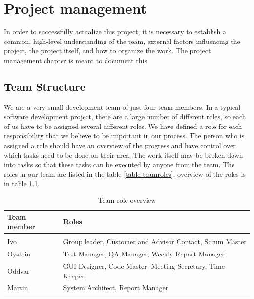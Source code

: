 \chapter{Project management}

\minitoc

In order to successfully actualize this project, it is necessary to establish a common, high-level understanding of the team, external factors influencing the project, the project itself, and how to organize the work. The project management chapter is meant to document this.

\clearpage

\section{Team Structure}
We are a very small development team of just four team members. In a typical software development project, there are a large number of different roles, so each of us have to be assigned several different roles. We have defined a role for each responsibility that we believe to be important in our process. The person who is assigned a role should have an overview of the progress and have control over which tasks need to be done on their area. The work itself may be broken down into tasks so that these tasks can be executed by anyone from the team. The roles in our team are listed in the table \ref{table-teamroles}, overview of the roles is in table \ref{table-rolesoverview}.

\begin{table}
\centering
\begin{tabular}{ l  l }
  \textbf{Team member} & \textbf{Roles} \\ 
  \hline \\ [-2.0ex]
  Ivo & Group leader, Customer and Advisor Contact, Scrum Master \\
  Oystein & Test Manager, QA Manager, Weekly Report Manager \\
  Oddvar & GUI Designer, Code Master, Meeting Secretary, Time Keeper \\
  Martin & System Architect, Report Manager \\
  \hline
\end{tabular}
\caption{Team role overview}
\label{table-rolesoverview}
\end{table}


